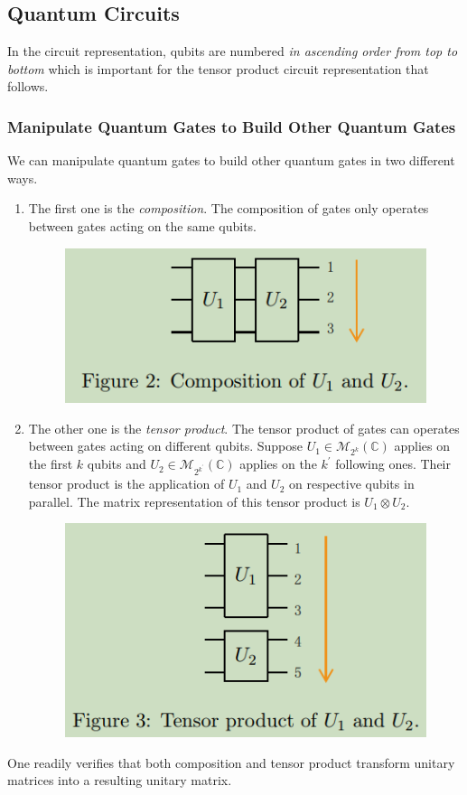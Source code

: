 \subsection{Quantum Circuits}

In the circuit representation, qubits are numbered \textit{in ascending order from top to bottom} which is important for the tensor product circuit representation that follows. %

\subsubsection{Manipulate Quantum Gates to Build Other Quantum Gates}

We can manipulate quantum gates to build other quantum gates in two different ways. 
\begin{enumerate}
    \item The first one is the \textit{composition}. The composition of gates only operates between gates acting on the same qubits. 
\begin{figure}[ht]
    \centering
    \includegraphics[width=0.5\linewidth]{Images/grange2023-1.png}
\end{figure}
    \item The other one is the \textit{tensor product}. The tensor product of gates can operates between gates acting on different qubits. Suppose $U_{1} \in \mathcal{M}_{2^{k}}(\mathbb{C})$ applies on the first $k$ qubits and $U_{2} \in \mathcal{M}_{2^{k^{\prime}}}(\mathbb{C})$ applies on the $k^{\prime}$ following ones. Their tensor product is the application of $U_{1}$ and $U_{2}$ on respective qubits in parallel. The matrix representation of this tensor product is $U_{1} \otimes U_{2}$. 
\begin{figure}[ht]
    \centering
    \includegraphics[width=0.5\linewidth]{Images/grange2023-2.png}
\end{figure}
\end{enumerate}
One readily verifies that both composition and tensor product transform unitary matrices into a resulting unitary matrix.

